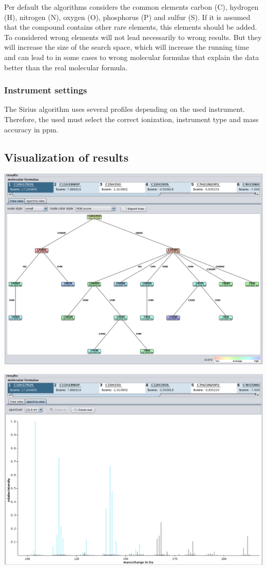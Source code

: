 \documentclass[a4paper,11pt]{article}
\begin{document}
 Per default the algorithms considers the common elements carbon (C), hydrogen (H), nitrogen (N), oxygen (O), phosphorus (P) and sulfur (S). 
 If it is assumed that the compound contains other rare elements, this elements should be added. To considered wrong elements will not lead necessarily 
 to wrong results. But they will increase the size of the search space, which will increase the running time and can lead to in some cases 
 to wrong molecular formulas that explain the data better than the real molecular formula.
 
 \subsubsection{Instrument settings}
 
 The Sirius algorithm uses several profiles depending on the used instrument. 
 Therefore, the used must select the correct ionization, instrument type  and mass accuracy in ppm.
 
 \subsection{Visualization of results}
 
 \includegraphics[width=0.9\linewidth]{pics/tree_view.png}
 
 \includegraphics[width=0.9\linewidth]{pics/spectra_view.png}
 
\end{document}
